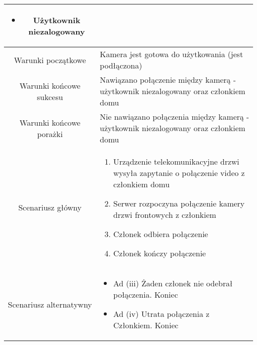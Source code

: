 \documentclass{article}
\begin{document}
\begin{enumerate}
\begin{enumerate}
\begin{table}[H]
\begin{tabular}{|c|p{7cm}|}
\begin{itemize}
\item Użytkownik niezalogowany\end{itemize}                                                                                                                                                                               \\
						\hline
						Warunki początkowe      & Kamera jest gotowa do użytkowania (jest podłączona)                                                                                                                                                                                                                      \\
						\hline
						Warunki końcowe sukcesu & Nawiązano połączenie między kamerą - użytkownik niezalogowany oraz członkiem domu                                                                                                                                                                                        \\
						\hline
						Warunki końcowe porażki & Nie nawiązano połączenia między kamerą - użytkownik niezalogowany oraz członkiem domu                                                                                                                                                                                    \\
						\hline
						Scenariusz główny       & \begin{enumerate}\item Urządzenie telekomunikacyjne drzwi wysyła zapytanie o połączenie video z członkiem domu

\item Serwer rozpoczyna połączenie kamery drzwi frontowych z członkiem

\item Członek odbiera połączenie

\item Członek kończy połączenie\end{enumerate} \\
						\hline
						Scenariusz alternatywny & \begin{itemize}\item Ad (iii) Żaden członek nie odebrał połączenia. Koniec

\item Ad (iv) Utrata połączenia z Członkiem. Koniec\end{itemize}                                                                                                                             \\
						\hline
					\end{tabular}
				\end{table}


\end{enumerate}
\end{enumerate}
\end{document}
